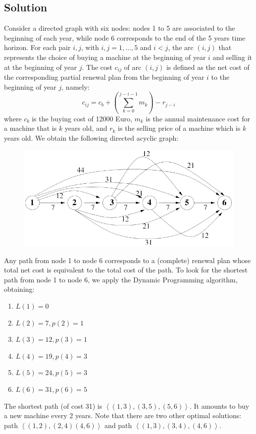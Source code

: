 \documentclass[12pt, a4paper]{report}
\begin{document}
    \subsection*{Solution}
        Consider a directed graph with six nodes: nodes 1 to 5 are associated to the beginning of each year, while node 6 corresponds to the end of the 5 years time horizon.
        For each pair $i, j$, with $i, j = 1, \dots , 5$ and $i < j$, the arc $(i, j)$ that represents the choice of buying a machine at the beginning of year $i$ and 
        selling it at the beginning of year $j$. The cost $c_{ij}$ of arc $(i, j)$ is defined as the net cost of the corresponding partial renewal plan from the beginning of 
        year $i$ to the beginning of year $j$, namely: 
        \[c_{ij}=c_b+\left( \sum_{k=0}^{j-i-1}m_k \right)-r_{j-i}\]
        where $c_b$ is the buying cost of 12000 Euro, $m_k$ is the annual maintenance cost for a machine that is $k$ years old, and $r_k$ is the selling price of a machine 
        which is $k$ years old. We obtain the following directed acyclic graph:
        \begin{figure}[H]
            \centering
            \includegraphics[width=0.75\linewidth]{images/dag.png}
        \end{figure}
        Any path from node 1 to node 6 corresponds to a (complete) renewal plan whose total net cost is equivalent to the total cost of the path. To look for the shortest 
        path from node 1 to node 6, we apply the Dynamic Programming algorithm, obtaining:
        \begin{enumerate}
            \item $L(1) = 0$
            \item $L(2) = 7, p(2) = 1$
            \item $L(3) = 12, p(3) = 1$
            \item $L(4) = 19, p(4) = 3$
            \item $L(5) = 24, p(5) = 3$
            \item $L(6) = 31, p(6) = 5$
        \end{enumerate}
        The shortest path (of cost 31) is $\left\langle (1, 3),(3, 5),(5, 6)\right\rangle $. It amounts to buy a new machine every 2 years. Note that there are two other 
        optimal solutions: path $\left\langle (1, 2),(2, 4)(4, 6)\right\rangle $ and path $\left\langle (1, 3),(3, 4),(4, 6)\right\rangle $.
\end{document}

